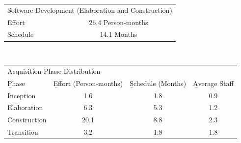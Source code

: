 \begin{tabularx}{\linewidth}{|X|c|}
\hline \multicolumn{2}{|l|}{\b Software Development (Elaboration and Construction)}\\
\Xhline{4\arrayrulewidth} Effort & 26.4 Person-months\\
\hline Schedule & 14.1 Months\\
\hline
\end{tabularx}\\

\begin{tabularx}{\linewidth}{|X|c|c|c|}
\hline \multicolumn{4}{|l|}{\b Acquisition Phase Distribution}\\
\Xhline{4\arrayrulewidth} \b{Phase} & \b{Effort (Person-months)} & \b{Schedule (Months)} & \b{Average Staff}\\
\Xhline{4\arrayrulewidth} Inception & 1.6 & 1.8 & 0.9\\
\hline Elaboration & 6.3 & 5.3 & 1.2\\
\hline Construction & 20.1 & 8.8 & 2.3\\
\hline Transition & 3.2 & 1.8 & 1.8\\
\hline
\end{tabularx}\\

